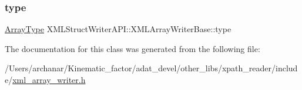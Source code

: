 \subsubsection{\texorpdfstring{type}{type}}
{\footnotesize\ttfamily \mbox{\hyperlink{namespaceXMLStructWriterAPI_a2017208be87c77a32bdc19ea2f14d032}{Array\+Type}} X\+M\+L\+Struct\+Writer\+A\+P\+I\+::\+X\+M\+L\+Array\+Writer\+Base\+::type\hspace{0.3cm}{\ttfamily [protected]}}



The documentation for this class was generated from the following file\+:\begin{DoxyCompactItemize}
\item 
/\+Users/archanar/\+Kinematic\+\_\+factor/adat\+\_\+devel/other\+\_\+libs/xpath\+\_\+reader/include/\mbox{\hyperlink{other__libs_2xpath__reader_2include_2xml__array__writer_8h}{xml\+\_\+array\+\_\+writer.\+h}}\end{DoxyCompactItemize}
